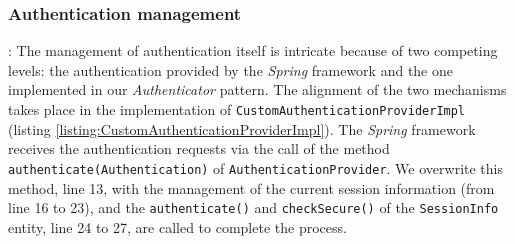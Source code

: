 \subsubsection{Authentication management}: 
The management of authentication itself is intricate because of two competing levels: the authentication provided by the \textit{Spring} framework and the one implemented in our \textit{Authenticator} pattern. The alignment of the two mechanisms takes place in the implementation of \texttt{CustomAuthenticationProviderImpl} (listing \ref{listing:CustomAuthenticationProviderImpl}). The \textit{Spring} framework receives the authentication requests via the call of the method \texttt{authenticate(Authentication)} of \texttt{AuthenticationProvider}. We overwrite this method, line 13,  with the management of the current session information (from line 16 to 23), and the  \texttt{authenticate()} and  \texttt{checkSecure()} of the  \texttt{SessionInfo} entity, line 24 to 27, are called to complete the process.

